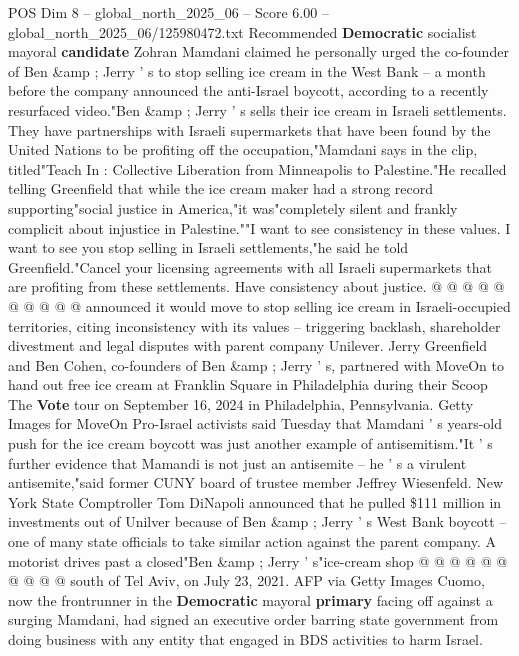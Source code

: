 \begin{textsample}{POS Dim 8 – global\_north\_2025\_06 – Score 6.00 – global\_north\_2025\_06/125980472.txt}  \label{ex:f8_pos_433}
Recommended \textbf{Democratic} socialist mayoral \textbf{candidate} Zohran Mamdani claimed he personally urged the co-founder of Ben \&amp ; Jerry ' s to stop selling ice cream in the West Bank -- a month before the company announced the anti-Israel boycott, according to a recently resurfaced video."Ben \&amp ; Jerry ' s sells their ice cream in Israeli settlements.
They have partnerships with Israeli supermarkets that have been found by the United Nations to be profiting off the occupation,"Mamdani says in the clip, titled"Teach In : Collective Liberation from Minneapolis to Palestine."He recalled telling Greenfield that while the ice cream maker had a strong record supporting"social justice in America,"it was"completely silent and frankly complicit about injustice in Palestine.""I want to see consistency in these values.
I want to see you stop selling in Israeli settlements,"he said he told Greenfield."Cancel your licensing agreements with all Israeli supermarkets that are profiting from these settlements.
Have consistency about justice. @ @ @ @ @ @ @ @ @ @ announced it would move to stop selling ice cream in Israeli-occupied territories, citing inconsistency with its values -- triggering backlash, shareholder divestment and legal disputes with parent company Unilever.
Jerry Greenfield and Ben Cohen, co-founders of Ben \&amp ; Jerry ' s, partnered with MoveOn to hand out free ice cream at Franklin Square in Philadelphia during their Scoop The \textbf{Vote} tour on September 16, 2024 in Philadelphia, Pennsylvania.
Getty Images for MoveOn Pro-Israel activists said Tuesday that Mamdani ' s years-old push for the ice cream boycott was just another example of antisemitism."It ' s further evidence that Mamandi is not just an antisemite -- he ' s a virulent antisemite,"said former CUNY board of trustee member Jeffrey Wiesenfeld.
New York State Comptroller Tom DiNapoli announced that he pulled \$111 million in investments out of Unilver because of Ben \&amp ; Jerry ' s West Bank boycott -- one of many state officials to take similar action against the parent company.
A motorist drives past a closed"Ben \&amp ; Jerry ' s"ice-cream shop @ @ @ @ @ @ @ @ @ @ south of Tel Aviv, on July 23, 2021.
AFP via Getty Images Cuomo, now the frontrunner in the \textbf{Democratic} mayoral \textbf{primary} facing off against a surging Mamdani, had signed an executive order barring state government from doing business with any entity that engaged in BDS activities to harm Israel.

\end{textsample}
